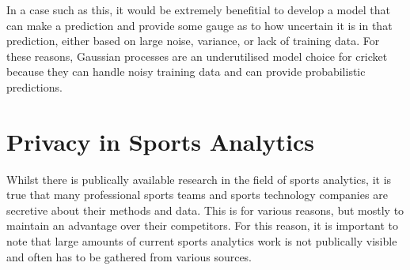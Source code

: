\documentclass[12pt,a4paper]{report}
\theoremstyle{definition}
\begin{document}
In a case such as this, it would be extremely benefitial to develop a model that can make a prediction and provide some gauge as to how uncertain it is in that prediction, either based on large noise, variance, or lack of training data.
For these reasons, Gaussian processes are an underutilised model choice for cricket because they can handle noisy training data and can provide probabilistic predictions.

\section{Privacy in Sports Analytics}

Whilst there is publically available research in the field of sports analytics, it is true that many professional sports teams and sports technology companies are secretive about their methods and data. 
This is for various reasons, but mostly to maintain an advantage over their competitors.
For this reason, it is important to note that large amounts of current sports analytics work is not publically visible and often has to be gathered from various sources.

%
%
%
%
%
%
%
\end{document}

